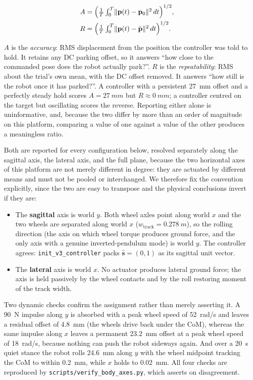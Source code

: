 \documentclass[conference]{IEEEtran}
\begin{document}
\begin{align}
A &= \Bigl(\tfrac{1}{T}\textstyle\int_0^T \lVert\mathbf{p}(t)-\mathbf{p}_0\rVert^2\,dt\Bigr)^{1/2},
\label{eq:accuracy}\\
R &= \Bigl(\tfrac{1}{T}\textstyle\int_0^T \lVert\mathbf{p}(t)-\bar{\mathbf{p}}\rVert^2\,dt\Bigr)^{1/2}.
\label{eq:repeatability}
\end{align}

$A$ is the \emph{accuracy}: RMS displacement from the position the controller was
told to hold. It retains any DC parking offset, so it answers ``how close to the
commanded pose does the robot actually park?''. $R$ is the \emph{repeatability}:
RMS about the trial's own mean, with the DC offset removed. It answers ``how still
is the robot once it has parked?''. A controller with a persistent \SI{27}{mm}
offset and a perfectly steady hold scores $A{=}\SI{27}{mm}$ but
$R{\approx}\SI{0}{mm}$; a controller centred on the target but oscillating scores
the reverse. Reporting either alone is uninformative, and, because the two differ
by more than an order of magnitude on this platform, comparing a value of one
against a value of the other produces a meaningless ratio.

Both are reported for every configuration below, resolved separately along the
sagittal axis, the lateral axis, and the full plane, because the two horizontal
axes of this platform are not merely different in degree: they are actuated by different means and must not be pooled or interchanged. We therefore fix the
convention explicitly, since the two are easy to transpose and the physical
conclusions invert if they are:

\begin{itemize}
\item The \textbf{sagittal} axis is world $y$. Both wheel axles point along world
$x$ and the two wheels are separated along world $x$
($w_{\text{track}}{=}\SI{0.278}{m}$), so the rolling direction (the axis on which wheel torque produces ground force, and the only axis with a genuine inverted-pendulum mode) is world $y$. The controller agrees: \verb|init_v3_controller|
packs $\hat{\mathbf{s}}=(0,1)$ as its sagittal unit vector.
\item The \textbf{lateral} axis is world $x$. No actuator produces lateral ground
force; the axis is held passively by the wheel contacts and by the roll restoring
moment of the track width.
\end{itemize}

\noindent Two dynamic checks confirm the assignment rather than merely asserting
it. A \SI{90}{N} impulse along $y$ is absorbed with a peak wheel speed of
\SI{52}{rad/s} and leaves a residual offset of \SI{4.8}{mm} (the wheels drive back under the CoM), whereas the same impulse along $x$ leaves a permanent
\SI{23.2}{mm} offset at a peak wheel speed of \SI{18}{rad/s}, because nothing can
push the robot sideways again. And over a \SI{20}{s} quiet stance the robot rolls
\SI{24.6}{mm} along $y$ with the wheel midpoint tracking the CoM to within
\SI{0.2}{mm}, while $x$ holds to \SI{0.02}{mm}. All four checks are reproduced by
\texttt{scripts/verify\_body\_axes.py}, which asserts on disagreement.
\end{document}
